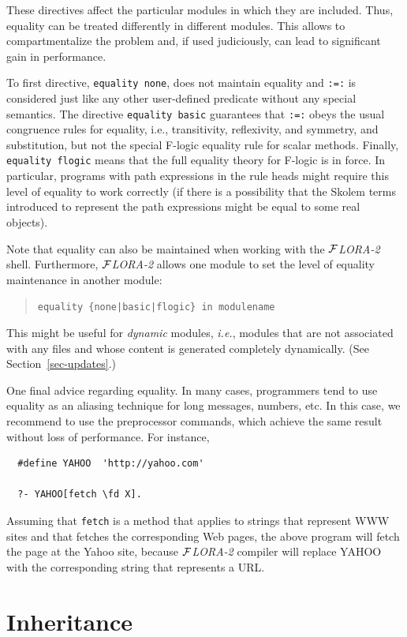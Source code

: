 \documentclass[11pt]{article}
\newcommand{\fd}{\ensuremath{{\rightarrow}}}                   %
\newcommand{\FLORA}{{\mbox{${\cal F}${\small\it LORA}\rm\emph{-2}}}\xspace}
\newcommand{\fl}{\mbox{F-logic}\xspace}
\begin{document}
\noindent
These directives affect the particular modules in which they are included.
Thus, equality can be treated differently in different modules. This allows
to compartmentalize the problem and, if used judiciously, can lead to
significant gain in performance.

To first directive, \mbox{\tt equality none}, does not maintain equality
and {\tt :=:} is considered just like any other user-defined predicate
without any special semantics.  The directive \mbox{\tt equality basic}
guarantees that {\tt :=:} obeys the usual congruence rules for equality,
i.e., transitivity, reflexivity, and symmetry, and substitution, but not the
special \fl equality rule for scalar methods. Finally, \mbox{\tt equality
  flogic} means that the full equality theory for \fl is in force.  In
particular, programs with path expressions in the rule heads might require
this level of equality to work correctly (if there is a possibility that
the Skolem terms introduced to represent the path expressions might be
equal to some real objects).

Note that equality can also be maintained when working with the \FLORA
shell. Furthermore, \FLORA allows one module to set the level of equality
maintenance in another module:
\begin{quote}
\verb!equality {none|basic|flogic} in modulename!
\end{quote}
This might be useful for \emph{dynamic} modules, {\it i.e.}, modules that
are not associated with any files and whose content is generated completely
dynamically. (See Section~\ref{sec-updates}.)

One final advice regarding equality. In many cases, programmers tend to use
equality as an aliasing technique for long messages, numbers, etc. In this
case, we recommend to use the preprocessor commands, which achieve the same
result without loss of performance. For instance,

\begin{verbatim}
  #define YAHOO  'http://yahoo.com'  

  ?- YAHOO[fetch \fd X].
\end{verbatim}
\noindent
Assuming that {\tt fetch} is a method that applies to strings that
represent WWW sites and that fetches the corresponding Web pages, the above
program will fetch the page at the Yahoo site, because \FLORA compiler will
replace YAHOO with the corresponding string that represents a URL.


\section{Inheritance}\label{sec-inheritance}
\end{document}
